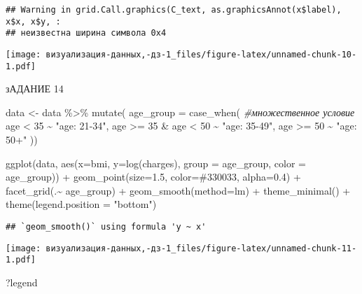 \documentclass[
]{article}
\newenvironment{Shaded}{\begin{snugshade}}{\end{snugshade}}
\newcommand{\AttributeTok}[1]{\textcolor[rgb]{0.77,0.63,0.00}{#1}}
\newcommand{\CommentTok}[1]{\textcolor[rgb]{0.56,0.35,0.01}{\textit{#1}}}
\newcommand{\DecValTok}[1]{\textcolor[rgb]{0.00,0.00,0.81}{#1}}
\newcommand{\FloatTok}[1]{\textcolor[rgb]{0.00,0.00,0.81}{#1}}
\newcommand{\FunctionTok}[1]{\textcolor[rgb]{0.00,0.00,0.00}{#1}}
\newcommand{\NormalTok}[1]{#1}
\newcommand{\OtherTok}[1]{\textcolor[rgb]{0.56,0.35,0.01}{#1}}
\newcommand{\SpecialCharTok}[1]{\textcolor[rgb]{0.00,0.00,0.00}{#1}}
\newcommand{\StringTok}[1]{\textcolor[rgb]{0.31,0.60,0.02}{#1}}
\begin{document}
\begin{verbatim}
## Warning in grid.Call.graphics(C_text, as.graphicsAnnot(x$label), x$x, x$y, :
## неизвестна ширина символа 0x4
\end{verbatim}

\texttt{[image: визуализация-данных,-дз-1\_files/figure-latex/unnamed-chunk-10-1.pdf]}

зАДАНИЕ 14

\begin{Shaded}
\begin{Highlighting}[]
\NormalTok{data }\OtherTok{\textless{}{-}}\NormalTok{ data }\SpecialCharTok{\%\textgreater{}\%} 
  \FunctionTok{mutate}\NormalTok{(}
    \AttributeTok{age\_group =} \FunctionTok{case\_when}\NormalTok{( }\CommentTok{\#множественное условие}
\NormalTok{      age }\SpecialCharTok{\textless{}} \DecValTok{35} \SpecialCharTok{\textasciitilde{}} \StringTok{"age: 21{-}34"}\NormalTok{, }
\NormalTok{      age }\SpecialCharTok{\textgreater{}=} \DecValTok{35} \SpecialCharTok{\&}\NormalTok{ age }\SpecialCharTok{\textless{}} \DecValTok{50} \SpecialCharTok{\textasciitilde{}} \StringTok{"age: 35{-}49"}\NormalTok{, }
\NormalTok{      age }\SpecialCharTok{\textgreater{}=} \DecValTok{50} \SpecialCharTok{\textasciitilde{}} \StringTok{"age: 50+"}\NormalTok{  ))}

  \FunctionTok{ggplot}\NormalTok{(data, }\FunctionTok{aes}\NormalTok{(}\AttributeTok{x=}\NormalTok{bmi, }\AttributeTok{y=}\FunctionTok{log}\NormalTok{(charges), }\AttributeTok{group =}\NormalTok{ age\_group, }\AttributeTok{color =}\NormalTok{ age\_group)) }\SpecialCharTok{+}
    \FunctionTok{geom\_point}\NormalTok{(}\AttributeTok{size=}\FloatTok{1.5}\NormalTok{, }\AttributeTok{color=}\StringTok{\textquotesingle{}\#330033\textquotesingle{}}\NormalTok{, }\AttributeTok{alpha=}\FloatTok{0.4}\NormalTok{) }\SpecialCharTok{+}
    \FunctionTok{facet\_grid}\NormalTok{(.}\SpecialCharTok{\textasciitilde{}}\NormalTok{ age\_group) }\SpecialCharTok{+}
    \FunctionTok{geom\_smooth}\NormalTok{(}\AttributeTok{method=}\NormalTok{lm) }\SpecialCharTok{+}
    \FunctionTok{theme\_minimal}\NormalTok{() }\SpecialCharTok{+}
    \FunctionTok{theme}\NormalTok{(}\AttributeTok{legend.position =} \StringTok{"bottom"}\NormalTok{)}
\end{Highlighting}
\end{Shaded}

\begin{verbatim}
## `geom_smooth()` using formula 'y ~ x'
\end{verbatim}

\texttt{[image: визуализация-данных,-дз-1\_files/figure-latex/unnamed-chunk-11-1.pdf]}

\begin{Shaded}
\begin{Highlighting}[]
\NormalTok{?legend}
\end{Highlighting}
\end{Shaded}
\end{document}

